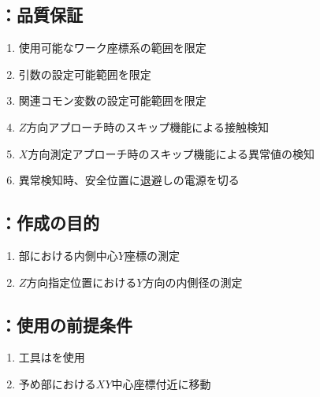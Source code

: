 \subsection{\MXIWidth：品質保証}
\begin{enumerate}[label*=\sarrow]
\item 使用可能なワーク座標系の範囲を限定
\item {}引数の設定可能範囲を限定
\item 関連コモン変数の設定可能範囲を限定
\item $Z$方向アプローチ時のスキップ機能による接触検知
\item $X$方向測定アプローチ時のスキップ機能による異常値の検知
\item 異常検知時、安全位置に退避し\TouchSensorProbe の電源を切る
\end{enumerate}



\clearpage


\subsection{\MYIWidth：作成の目的}
\begin{enumerate}[label*=\sarrow]
\item \EndFace 部における内側中心$Y$座標の測定
\item $Z$方向指定位置における$Y$方向の内側径の測定
\end{enumerate}


\subsection{\MYIWidth：使用の前提条件}
\begin{enumerate}[label*=\sarrow]
\item 工具は\TouchSensorProbe を使用
\item 予め\EndFace 部における$XY$中心座標付近に移動
\end{enumerate}


